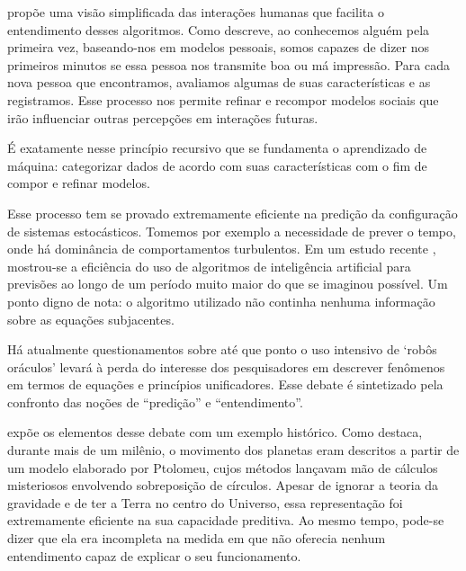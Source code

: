  propõe uma visão simplificada das interações humanas que facilita o entendimento desses algoritmos. Como descreve, ao conhecemos alguém pela primeira vez, baseando-nos em modelos pessoais, somos capazes de dizer nos primeiros minutos se essa pessoa nos transmite boa ou má impressão. Para cada nova pessoa que encontramos, avaliamos algumas de suas características e as registramos. Esse processo nos permite refinar e recompor modelos sociais que irão influenciar outras percepções em interações futuras. 

É exatamente nesse princípio recursivo que se fundamenta o aprendizado de máquina: categorizar dados de acordo com suas características com o fim de compor e refinar modelos.

Esse processo tem se provado extremamente eficiente na predição da configuração de sistemas estocásticos. Tomemos por exemplo a necessidade de prever o tempo, onde há dominância de comportamentos turbulentos. Em um estudo recente , mostrou-se a eficiência do uso de algoritmos de inteligência artificial para previsões ao longo de um período muito maior do que se imaginou possível. Um ponto digno de nota: o algoritmo utilizado não continha nenhuma informação sobre as equações subjacentes. 

Há atualmente questionamentos sobre até que ponto o uso intensivo de `robôs oráculos' levará à perda do interesse dos pesquisadores em descrever fenômenos em termos de equações e princípios unificadores. Esse debate é sintetizado pela confronto das noções de ``predição'' e ``entendimento''.

 expõe os elementos desse debate com um exemplo histórico. Como destaca, durante mais de um milênio, o movimento dos planetas eram descritos a partir de um modelo elaborado por Ptolomeu, cujos métodos lançavam mão de cálculos misteriosos envolvendo sobreposição de círculos. Apesar de ignorar a teoria da gravidade e de ter a Terra no centro do Universo, essa representação foi extremamente eficiente na sua capacidade preditiva. Ao mesmo tempo, pode-se dizer que ela era incompleta na medida em que não oferecia nenhum entendimento capaz de explicar o seu funcionamento.

